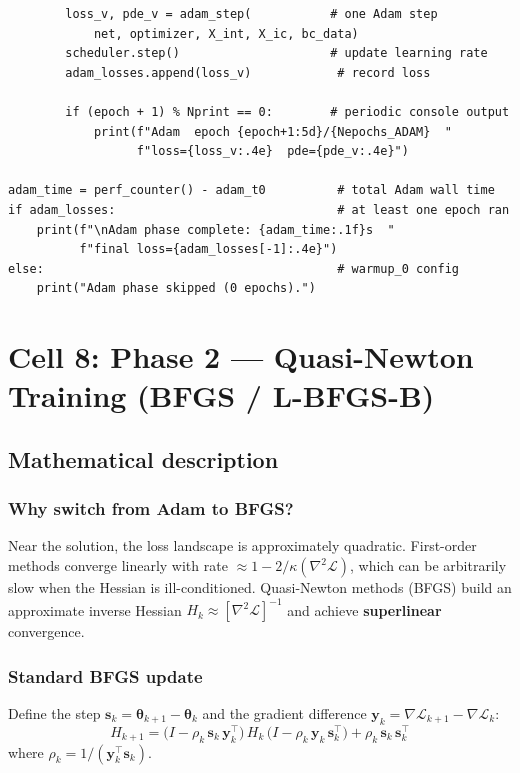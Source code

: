 \documentclass[11pt,a4paper]{article}
\begin{document}
\begin{lstlisting}
        loss_v, pde_v = adam_step(           # one Adam step
            net, optimizer, X_int, X_ic, bc_data)
        scheduler.step()                     # update learning rate
        adam_losses.append(loss_v)            # record loss

        if (epoch + 1) % Nprint == 0:        # periodic console output
            print(f"Adam  epoch {epoch+1:5d}/{Nepochs_ADAM}  "
                  f"loss={loss_v:.4e}  pde={pde_v:.4e}")

adam_time = perf_counter() - adam_t0          # total Adam wall time
if adam_losses:                               # at least one epoch ran
    print(f"\nAdam phase complete: {adam_time:.1f}s  "
          f"final loss={adam_losses[-1]:.4e}")
else:                                         # warmup_0 config
    print("Adam phase skipped (0 epochs).")
\end{lstlisting}


\section{Cell 8: Phase 2 --- Quasi-Newton Training (BFGS / L-BFGS-B)}
\label{sec:bfgs}

\subsection*{Mathematical description}

\subsubsection*{Why switch from Adam to BFGS?}

Near the solution, the loss landscape is approximately quadratic.
First-order methods converge linearly with rate
$\approx 1 - 2/\kappa(\nabla^2\!\mathcal{L})$, which can be
arbitrarily slow when the Hessian is ill-conditioned.  Quasi-Newton
methods (BFGS) build an approximate inverse Hessian
$H_k \approx [\nabla^2\!\mathcal{L}]^{-1}$ and achieve
\textbf{superlinear} convergence.

\subsubsection*{Standard BFGS update}

Define the step $\bm{s}_k = \bm\theta_{k+1} - \bm\theta_k$ and the
gradient difference $\bm{y}_k = \nabla\mathcal{L}_{k+1} - \nabla\mathcal{L}_k$:
\begin{equation}
  H_{k+1} = \bigl(I - \rho_k\,\bm{s}_k\,\bm{y}_k^\top\bigr)\,
             H_k\,
             \bigl(I - \rho_k\,\bm{y}_k\,\bm{s}_k^\top\bigr)
             + \rho_k\,\bm{s}_k\,\bm{s}_k^\top
\label{eq:bfgs}
\end{equation}
where $\rho_k = 1 / (\bm{y}_k^\top\bm{s}_k)$.
\end{document}
